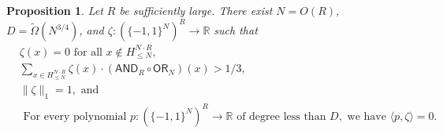 \documentclass[11pt, letterpaper, fleqn]{article}
\newtheorem{proposition}[theorem]{Proposition}
\theoremstyle{plain}
\newcommand{\R}{\mathbb{R}}
\newcommand{\OR}{\mathsf{ OR}}
\newcommand{\bits}{\{-1,1\}}
\newcommand{\tOmega}{\tilde{\Omega}}
\newcommand{\AND}{\mathsf{AND}}
\begin{document}
\label{sec:parametersetting} 


\begin{proposition} \label{prop:surj-dual}
Let $R$ be sufficiently large. There exist $N = O(R)$, $D = \tOmega(N^{3/4})$, and  $\zeta : (\bits^N)^R \to \R$ such that
\begin{align} \label{eq:surj-zero} &\zeta(x) = 0 \text{ for all } x \not\in H_{\le N}^{N \cdot R}, \\
\label{eq:surj-corr} &\sum_{x \in H_{\le N}^{N \cdot R}}\zeta(x) \cdot (\AND_{R} \circ \OR_N)(x) > 1/3, \\
 \label{eq:surj-unitnorm} &\|\zeta\|_1 = 1, \text{ and }  \\
 \label{eq:surj-phd} &\text{ For every polynomial } p \colon (\bits^N)^R\to \R \text{ of degree less than } D, \text{ we have } \langle p, \zeta \rangle = 0. 
\end{align}
\end{proposition}
\end{document}

